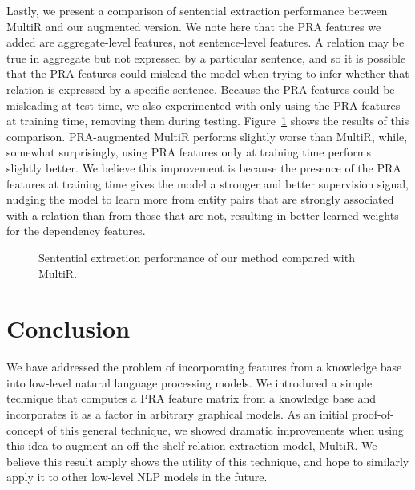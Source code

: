 \documentclass[11pt,a4paper]{article}
\newcommand{\figref}[1]{Figure~\ref{fig:#1}}
\begin{document}
Lastly, we present a comparison of sentential extraction performance between
MultiR and our augmented version.  We note here that the PRA features we added
are aggregate-level features, not sentence-level features.  A relation may be
true in aggregate but not expressed by a particular sentence, and so it is
possible that the PRA features could mislead the model when trying to infer
whether that relation is expressed by a specific sentence.  Because the PRA
features could be misleading at test time, we also experimented with only using
the PRA features at training time, removing them during testing.
\figref{sentential-comparison} shows the results of this comparison.
PRA-augmented MultiR performs slightly worse than MultiR, while, somewhat
surprisingly, using PRA features only at training time performs slightly
better.  We believe this improvement is because the presence of the PRA
features at training time gives the model a stronger and better supervision
signal, nudging the model to learn more from entity pairs that are strongly
associated with a relation than from those that are not, resulting in better
learned weights for the dependency features.

\begin{figure}
  \centering
  \caption{Sentential extraction performance of our method compared with
  MultiR.}
  \label{fig:sentential-comparison}
\end{figure}

\section{Conclusion}

We have addressed the problem of incorporating features from a knowledge base
into low-level natural language processing models.  We introduced a simple
technique that computes a PRA feature matrix from a knowledge base and
incorporates it as a factor in arbitrary graphical models.  As an initial
proof-of-concept of this general technique, we showed dramatic improvements
when using this idea to augment an off-the-shelf relation extraction model,
MultiR.  We believe this result amply shows the utility of this technique, and
hope to similarly apply it to other low-level NLP models in the future.



\end{document}
